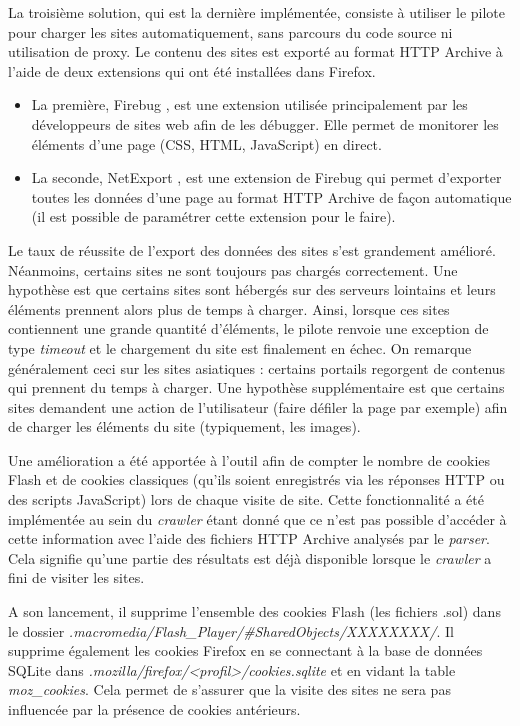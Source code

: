 La troisième solution, qui est la dernière implémentée, consiste à utiliser le pilote pour charger les sites automatiquement, sans parcours du code source ni utilisation de proxy. Le contenu des sites est exporté au format HTTP Archive à l'aide de deux extensions qui ont été installées dans Firefox.
\begin{itemize}
	\item La première, Firebug \cite{firebug_homepage}, est une extension utilisée principalement par les développeurs de sites web afin de les débugger. Elle permet de monitorer les éléments d'une page (CSS, HTML, JavaScript) en direct.
	\item La seconde, NetExport \cite{netexport_homepage}, est une extension de Firebug qui permet d'exporter toutes les données d'une page au format HTTP Archive de façon automatique (il est possible de paramétrer cette extension pour le faire).
\end{itemize}

Le taux de réussite de l'export des données des sites s'est grandement amélioré. Néanmoins, certains sites ne sont toujours pas chargés correctement.
Une hypothèse est que certains sites sont hébergés sur des serveurs lointains et leurs éléments prennent alors plus de temps à charger. Ainsi, lorsque ces sites contiennent une grande quantité d'éléments, le pilote renvoie une exception de type \textit{timeout} et le chargement du site est finalement en échec. On remarque généralement ceci sur les sites asiatiques : certains portails regorgent de contenus qui prennent du temps à charger.
Une hypothèse supplémentaire est que certains sites demandent une action de l'utilisateur (faire défiler la page par exemple) afin de charger les éléments du site (typiquement, les images).
\newline

Une amélioration a été apportée à l'outil afin de compter le nombre de cookies Flash et de cookies classiques (qu'ils soient enregistrés via les réponses HTTP ou des scripts JavaScript) lors de chaque visite de site. Cette fonctionnalité a été implémentée au sein du \textit{crawler} étant donné que ce n'est pas possible d'accéder à cette information avec l'aide des fichiers HTTP Archive analysés par le \textit{parser}. Cela signifie qu'une partie des résultats est déjà disponible lorsque le \textit{crawler} a fini de visiter les sites.

A son lancement, il supprime l'ensemble des cookies Flash (les fichiers .sol) dans le dossier \textit{.macromedia/Flash\_Player/\#SharedObjects/XXXXXXXX/}. Il supprime également les cookies Firefox en se connectant à la base de données SQLite dans \textit{.mozilla/firefox/<profil>/cookies.sqlite} et en vidant la table \textit{moz\_cookies}. Cela permet de s'assurer que la visite des sites ne sera pas influencée par la présence de cookies antérieurs.

